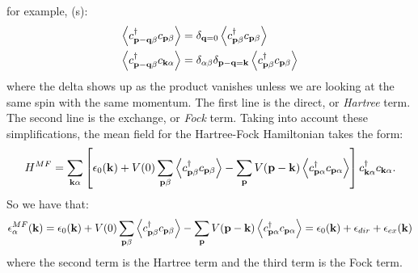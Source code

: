 for example, (s):
\begin{equation}
    \begin{split}
        \left< c^{\dagger}_{\mathbf{p} - \mathbf{q}\beta}c_{\mathbf{p}\beta} \right> &= \delta_{\mathbf{q} = 0}\left< c^{\dagger}_{\mathbf{p}\beta}c_{\mathbf{p}\beta} \right>
        \\ \left< c^{\dagger}_{\mathbf{p} - \mathbf{q}\beta}c_{\mathbf{k}\alpha} \right> &= \delta_{\alpha\beta}\delta_{\mathbf{p} - \mathbf{q} = \mathbf{k}}\left< c^{\dagger}_{\mathbf{p}\beta}c_{\mathbf{p}\beta} \right>
    \end{split}
\end{equation}
where the delta shows up as the product vanishes unless we are looking at the same spin with the same momentum. The first line is the direct, or \emph{Hartree} term. The second line is the exchange, or \emph{Fock} term. Taking into account these simplifications, the mean field for the Hartree-Fock Hamiltonian takes the form:
\begin{equation}
    H^{MF} = \sum_{\mathbf{k}\alpha}\left[\epsilon_{0}(\mathbf{k}) + V(0)\sum_{\mathbf{p}\beta}\left< c^{\dagger}_{\mathbf{p}\beta}c_{\mathbf{p}\beta} \right> - \sum_{\mathbf{p}}V(\mathbf{p} - \mathbf{k})\left< c^\dagger_{\mathbf{p}\alpha}c_{\mathbf{p}\alpha} \right>\right]c_{\mathbf{k}\alpha}^\dagger c_{\mathbf{k}\alpha}.
\end{equation}
So we have that:
\begin{align*}
    \epsilon_{\alpha}^{MF}(\mathbf{k}) = \epsilon_{0}(\mathbf{k}) + V(0)\sum_{\mathbf{p}\beta}\left< c^{\dagger}_{\mathbf{p}\beta}c_{\mathbf{p}\beta} \right> - \sum_{\mathbf{p}}V(\mathbf{p} - \mathbf{k})\left< c^\dagger_{\mathbf{p}\alpha}c_{\mathbf{p}\alpha} \right> = \epsilon_{0}(\mathbf{k}) + \epsilon_{dir} + \epsilon_{ex}(\mathbf{k})
\end{align*}
where the second term is the Hartree term and the third term is the Fock term.

